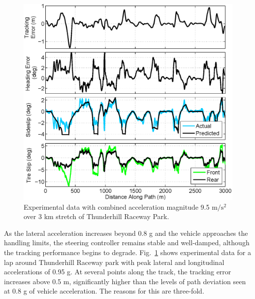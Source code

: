 \documentclass{nVSD2e}
\theoremstyle{plain}
\theoremstyle{definition}
\theoremstyle{remark}
\begin{document}
\begin{figure}[h]
\centering
\includegraphics[width=\columnwidth]{figures/atTheLimits.eps}
\caption{Experimental data with combined acceleration magnitude 9.5 $\mathrm{m/s^2}$ over 3 km stretch of Thunderhill Raceway Park.}
\label{fig:atTheLimits}
\end{figure}

As the lateral acceleration increases beyond 0.8 g and the vehicle approaches the handling limits, the steering controller
remains stable and well-damped, although the tracking performance begins to degrade. Fig.~\ref{fig:atTheLimits} shows experimental
data for a lap around Thunderhill Raceway park with peak lateral and longitudinal accelerations of 0.95 g. At several points along the
track, the tracking error increases above 0.5 m, significantly higher than the levels of path deviation seen at 0.8 g of vehicle acceleration.
The reasons for this are three-fold. 
\end{document}
